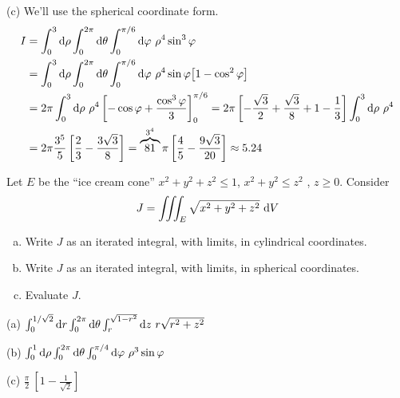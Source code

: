 \begin{solution}
(c) We'll use the spherical coordinate form.
\begin{align*}
I  &=\int_0^{3}\mathrm{d}\rho\int_0^{2\pi}\mathrm{d}\theta
           \int_0^{\pi/6}\mathrm{d}\varphi\ \rho^4\sin^3\varphi \\
   &=\int_0^{3}\mathrm{d}\rho\int_0^{2\pi}\mathrm{d}\theta
           \int_0^{\pi/6}\mathrm{d}\varphi\ \rho^4\sin\varphi
              \big[1-\cos^2\varphi\big] \\
   &=2\pi \int_0^3\mathrm{d}\rho\ \rho^4
                \left[-\cos\varphi +\frac{\cos^3\varphi}{3}\right]_0^{\pi/6}
    =2\pi \left[-\frac{\sqrt{3}}{2} + \frac{\sqrt{3}}{8}+1-\frac{1}{3}\right]
                      \int_0^3\mathrm{d}\rho\ \rho^4 \\
    &=2\pi \frac{3^5}{5}\left[\frac{2}{3} - \frac{3\sqrt{3}}{8}\right]
     =\overbrace{81}^{3^4}\pi \left[\frac{4}{5} - \frac{9\sqrt{3}}{20}\right]
     \approx 5.24
\end{align*}
\end{solution}

\begin{question}[M200 2011A] %
Let $E$ be the ``ice cream cone'' $x^2 + y^2 + z^2 \le 1$, 
$x^2 + y^2 \le z^2$ , $z \ge 0$. Consider
\begin{equation*}
J =\iiint_E \sqrt{x^2+y^2+z^2}\ \mathrm{d}V
\end{equation*}
\begin{enumerate}[(a)]
\item
Write $J$ as an iterated integral, with limits, in cylindrical coordinates.
\item
Write $J$ as an iterated integral, with limits, in spherical coordinates.
\item
Evaluate $J$.
\end{enumerate}
\end{question}

%

\begin{answer}
(a) $\int_0^{1/\sqrt{2}}\mathrm{d}r\int_0^{2\pi}\mathrm{d}\theta
           \int_r^{\sqrt{1-r^2}}\mathrm{d}z\ r\sqrt{r^2+z^2}$

(b) $\int_0^{1}\mathrm{d}\rho\int_0^{2\pi}\mathrm{d}\theta
           \int_0^{\pi/4}\mathrm{d}\varphi\ \rho^3\sin\varphi$

(c) $\frac{\pi}{2}\ \left[1-\frac{1}{\sqrt{2}}\right]$
\end{answer}

